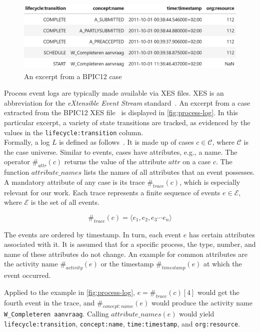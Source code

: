 \begin{figure}
    \centering
    \begin{adjustbox}{center}
    \includegraphics[width=1\textwidth]{gfx/process-log.png}
    \end{adjustbox}
    \caption{An excerpt from a BPIC12 case}
    \label{fig:process-log}
\end{figure}

Process event logs are typically made available via XES files. XES is an abbreviation for the \textit{eXtensible Event Stream} standard~\cite{gunther2013xes}. An excerpt from a case extracted from the BPIC12 XES file~\cite{BPIC2012} is displayed in \autoref{fig:process-log}. In this particular excerpt, a variety of state transitions are tracked, as evidenced by the values in the \verb=lifecycle:transition= column.\\

Formally, a log $L$ is defined as follows~\cite{Aalst2016}. It is made up of cases $c \in \mathscr{C}$, where $\mathscr{C}$ is the case universe. Similar to events, cases have attributes, e.g., a name. The operator $\#_{attr}(c)$ returns the value of the attribute $attr$ on a case $c$. The function $attribute\_names$ lists the names of all attributes that an event possesses. A mandatory attribute of any case is its trace $\#_{trace}(c)$, which is especially relevant for our work.
Each trace represents a finite sequence of events $e \in \mathscr{E}$, where $\mathscr{E}$ is the set of all events.

$$ \#_{trace}(c) = \langle e_1, e_2, e_3 \cdots e_n \rangle $$

The events are ordered by timestamp. In turn, each event $e$ has certain attributes associated with it. It is assumed that for a specific process, the type, number, and name of these attributes do not change. An example for common attributes are the activity name $\#_{activity}(e)$ or the timestamp $\#_{timestamp}(e)$ at which the event occurred.

Applied to the example in \autoref{fig:process-log}, $e = \#_{trace}(c)[4]$ would get the fourth event in the trace, and $\#_{concept:name}(e)$ would produce the activity name \verb=W_Completeren aanvraag=.
Calling $attribute\_names(e)$ would yield \verb=lifecycle:transition=, \verb=concept:name=, \verb=time:timestamp=, and \verb=org:resource=.

